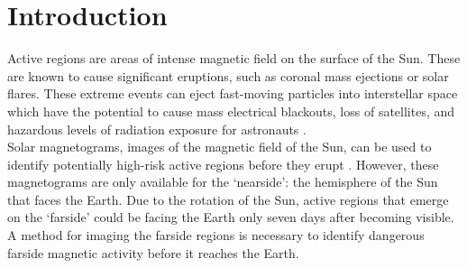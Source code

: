 \documentclass[11pt,a4paper,onecolumn]{report}
\begin{document}





\tableofcontents









%
%
%
%
\chapter{Introduction}
%
%
%
%

Active regions are areas of intense magnetic field on the surface of the Sun.
These are known to cause significant eruptions, such as coronal mass ejections
or solar flares. These extreme events can eject fast-moving particles into
interstellar space which have the potential to cause mass electrical blackouts,
loss of satellites, and hazardous levels of radiation exposure for astronauts
\citep{Mewaldt2005,council_severe_2008}. \\

Solar magnetograms, images of the magnetic field of the Sun, can be used to
identify potentially high-risk active regions before they erupt
\citep{bobra_solar_2015}. However, these magnetograms are only available for the
`nearside': the hemisphere of the Sun that faces the Earth. Due to the rotation of
the Sun, active regions that emerge on the `farside' could be facing the Earth
only seven days after becoming visible. A method for imaging the farside
regions is necessary to identify dangerous farside magnetic activity before it
reaches the Earth. \\
\end{document}
